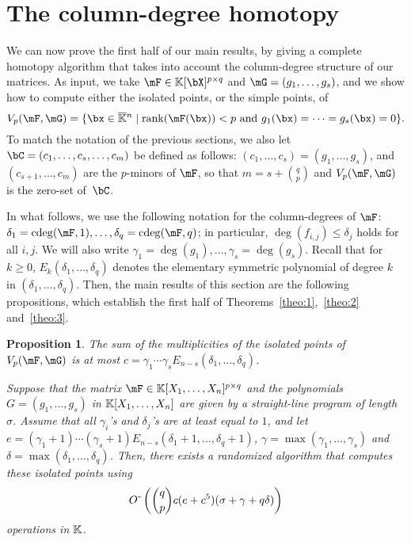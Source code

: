 \documentclass[12pt]{article}
\newtheorem{proposition}[definition]{Proposition}
\begin{document}
\section{The column-degree homotopy}\label{sec:columndegree}

We can now prove the first half of our main results, by giving a
complete homotopy algorithm that takes into account the column-degree
structure of our matrices. As input, we take $\mF \in \K[\bX]^{p\times q}$ and $\mG=(g_1,\dots,g_s)$,
and we show how to compute either the isolated points, or
the simple points, of
$$\VpFG{p}{\mF}{\mG} = \{\bx \in \KKbar{}^n \mid
\mathrm{rank}(\mF({\bx})) < p \text{~and~}
g_1(\bx)=\cdots=g_s(\bx)=0\}.$$ 
To match the notation of the previous sections, we also let
$\bC=(c_1,\dots,c_{s},\dots,c_m)$ be defined as follows:
$(c_1,\dots,c_{s})=(g_1,\dots,g_s)$, and $(c_{s+1},\dots,c_{m})$ are
the $p$-minors of $\mF$, so that $m=s+{q \choose p}$ and
$\VpFG{p}{\mF}{\mG}$ is the zero-set of~$\bC$.


In what follows, we use the following notation for the column-degrees
of $\mF$: $\delta_1=\cdeg(\mF,1),\dots,\delta_q=\cdeg(\mF,q)$; in
particular, $\deg(f_{i,j}) \leq \delta_j$ holds for all $i,j$.  We
will also write $\gamma_1=\deg(g_1),\dots,\gamma_s=\deg(g_s)$.  Recall
that for $k\geq 0$, $E_k(\delta_1,\dots,\delta_q)$ denotes the
elementary symmetric polynomial of degree $k$ in $(\delta_1, \ldots,
\delta_q)$. Then, the main results of this section are the following
propositions, which establish the first half of
Theorems~\ref{theo:1},~\ref{theo:2} and~\ref{theo:3}.

\begin{proposition}\label{prop:coldeg}
  The sum
  of the multiplicities of the isolated points of $\VpFG{p}{\mF}{\mG}$
is at most
  $c=\gamma_1\cdots\gamma_sE_{n-s}(\delta_1, \ldots, \delta_q)$.

  Suppose that the matrix $\mF \in \KK[X_1,\dots,X_n]^{p \times q}$
  and the polynomials $G=(g_1,\dots,g_s)$ in $\mathbb{K}[X_1,\dots,X_n]$ are
  given by a straight-line program of length $\sigma$. 
  Assume that all $\gamma_i$'s and $\delta_j$'s are at least equal to
  $1$, and let
  $e=(\gamma_1+1)\cdots(\gamma_s+1) E_{n-s}(\delta_1+1, \ldots,
  \delta_q+1)$, $\gamma = \max(\gamma_1, \ldots, \gamma_s)$ and
  $\delta = \max(\delta_1, \ldots, \delta_q)$.
  Then, there exists a randomized algorithm that computes these isolated
  points using
  $$
  {O}{\,\tilde{ }\,}\left ({q \choose p} c(e+c^5 )(\sigma +\gamma + q
    \delta)\right)
  $$
  operations in $\mathbb{K}$.
\end{proposition}
\end{document}
